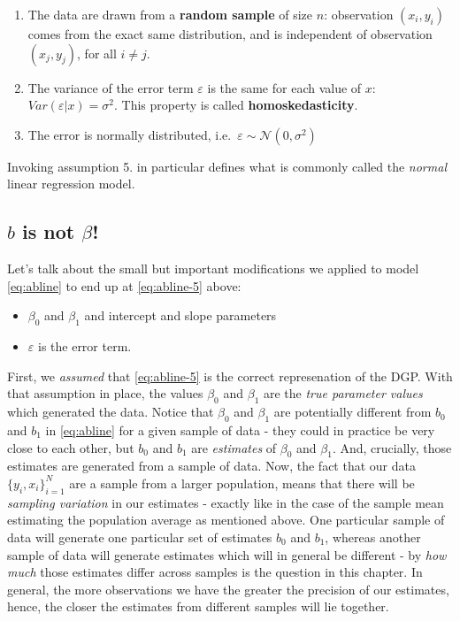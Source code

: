 \documentclass[]{book}
\providecommand{\tightlist}{%
  \setlength{\itemsep}{0pt}\setlength{\parskip}{0pt}}
\begin{document}
\begin{enumerate}
\def\labelenumi{\arabic{enumi}.}
\setcounter{enumi}{2}
\tightlist
\item
  The data are drawn from a \textbf{random sample} of size \(n\): observation \((x_i,y_i)\) comes from the exact same distribution, and is independent of observation \((x_j,y_j)\), for all \(i\neq j\).
\item
  The variance of the error term \(\varepsilon\) is the same for each value of \(x\): \(Var(\varepsilon|x) = \sigma^2\). This property is called \textbf{homoskedasticity}.
\item
  The error is normally distributed, i.e.~\(\varepsilon \sim \mathcal{N}(0,\sigma^2)\)
\end{enumerate}

Invoking assumption 5. in particular defines what is commonly called the \emph{normal} linear regression model.

\hypertarget{b-is-not-beta}{%
\subsection{\texorpdfstring{\(b\) is not \(\beta\)!}{b is not \textbackslash beta!}}\label{b-is-not-beta}}

Let's talk about the small but important modifications we applied to model \eqref{eq:abline} to end up at \eqref{eq:abline-5} above:

\begin{itemize}
\tightlist
\item
  \(\beta_0\) and \(\beta_1\) and intercept and slope parameters
\item
  \(\varepsilon\) is the error term.
\end{itemize}

First, we \emph{assumed} that \eqref{eq:abline-5} is the correct represenation of the DGP. With that assumption in place, the values \(\beta_0\) and \(\beta_1\) are the \emph{true parameter values} which generated the data. Notice that \(\beta_0\) and \(\beta_1\) are potentially different from \(b_0\) and \(b_1\) in \eqref{eq:abline} for a given sample of data - they could in practice be very close to each other, but \(b_0\) and \(b_1\) are \emph{estimates} of \(\beta_0\) and \(\beta_1\). And, crucially, those estimates are generated from a sample of data. Now, the fact that our data \(\{y_i,x_i\}_{i=1}^N\) are a sample from a larger population, means that there will be \emph{sampling variation} in our estimates - exactly like in the case of the sample mean estimating the population average as mentioned above. One particular sample of data will generate one particular set of estimates \(b_0\) and \(b_1\), whereas another sample of data will generate estimates which will in general be different - by \emph{how much} those estimates differ across samples is the question in this chapter. In general, the more observations we have the greater the precision of our estimates, hence, the closer the estimates from different samples will lie together.
\end{document}
